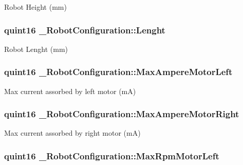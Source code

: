 Robot Height (mm) \hypertarget{struct___robot_configuration_ab61562623c27b882ecb55262336efb96}{
\subsubsection[{Lenght}]{\setlength{\rightskip}{0pt plus 5cm}quint16 \-\_\-\-Robot\-Configuration\-::\-Lenght}}\label{struct___robot_configuration_ab61562623c27b882ecb55262336efb96}
Robot Lenght (mm) \hypertarget{struct___robot_configuration_ab7e58c3cd60604b5965a432eb3e483a4}{
\subsubsection[{Max\-Ampere\-Motor\-Left}]{\setlength{\rightskip}{0pt plus 5cm}quint16 \-\_\-\-Robot\-Configuration\-::\-Max\-Ampere\-Motor\-Left}}\label{struct___robot_configuration_ab7e58c3cd60604b5965a432eb3e483a4}
Max current assorbed by left motor (m\-A) \hypertarget{struct___robot_configuration_a42620d2d390b5647ad91080099804f24}{
\subsubsection[{Max\-Ampere\-Motor\-Right}]{\setlength{\rightskip}{0pt plus 5cm}quint16 \-\_\-\-Robot\-Configuration\-::\-Max\-Ampere\-Motor\-Right}}\label{struct___robot_configuration_a42620d2d390b5647ad91080099804f24}
Max current assorbed by right motor (m\-A) \hypertarget{struct___robot_configuration_a2a12b5f279876cf7dac9ab2d1129d793}{
\subsubsection[{Max\-Rpm\-Motor\-Left}]{\setlength{\rightskip}{0pt plus 5cm}quint16 \-\_\-\-Robot\-Configuration\-::\-Max\-Rpm\-Motor\-Left}}\label{struct___robot_configuration_a2a12b5f279876cf7dac9ab2d1129d793}
